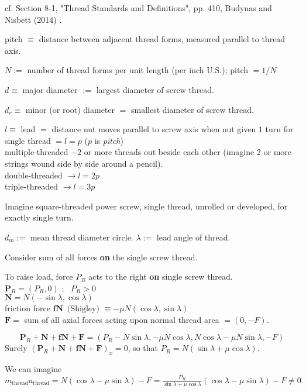\documentclass[10pt]{amsart}
\begin{document}
\begin{multicols*}{2}
cf. Section 8-1, "Thread Standards and Definitions", pp. 410, Budynas and Nisbett (2014) \cite{BuNi2014}.  
 
pitch $\equiv $ distance between adjacent thread forms, measured parallel to thread axis.  

$N :=$ number of thread forms per unit length (per inch U.S.); pitch $=1/N$  

$d\equiv $ major diameter $:=$ largest diameter of screw thread.  

$d_r \equiv $ minor (or root) diameter $=$ smallest diameter of screw thread.  

$l \equiv $ lead $=$ distance nut moves parallel to screw axis when nut given $1$ turn for \\
single thread $=l=p$ ($p$ is \emph{pitch}) \\
multiple-threaded $- 2 $ or more threads out beside each other (imagine 2 or more strings wound side by side around a pencil).  \\
double-threaded $\to l = 2p$  \\
triple-threaded $\to l=3p$  

Imagine square-threaded power screw, single thread, unrolled or developed, for exactly single turn.  

$d_m:= $ mean thread diameter circle.  $\lambda := $ lead angle of thread.  

Consider sum of all forces \textbf{on} the single screw thread.  

To raise load, force $P_R$ acts to the right \textbf{on} single screw thread.   \\
$\mathbf{P}_R = (P_R,0)$ ; \, $P_R >0$ \\
$\mathbf{N}= N (-\sin{\lambda}, \cos{\lambda} )$  \\ 
friction force $\mathbf{fN} \, \text{ (Shigley) } \equiv - \mu N(\cos{\lambda}, \sin{\lambda})$ \\
$\mathbf{F} =$ sum of all axial forces acting upon normal thread area $=(0,-F)$.  

\begin{equation}
	\mathbf{P}_R + \mathbf{N} + \mathbf{fN} + \mathbf{F} = (P_R-N\sin{\lambda} , - \mu N \cos{\lambda}, N\cos{\lambda} - \mu N\sin{\lambda}, -F)
\end{equation}
Surely $(\mathbf{P}_R + \mathbf{N} + \mathbf{fN} + \mathbf{F})_x =0$, so that $P_R = N( \sin{\lambda} + \mu \cos{\lambda})$.  

We can imagine $m_{\text{thread}} a_{\text{thread}} = N (\cos{\lambda} - \mu \sin{\lambda}) -F = \frac{P_R}{ \sin{\lambda} + \mu \cos{\lambda} }(\cos{\lambda} - \mu\sin{\lambda} ) -F \neq 0 $


\end{multicols*}
\end{document}
